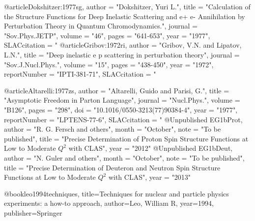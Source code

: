 @article{Dokshitzer:1977sg,
      author         = "Dokshitzer, Yuri L.",
      title          = "{Calculation of the Structure Functions for Deep
                        Inelastic Scattering and e+ e- Annihilation by
                        Perturbation Theory in Quantum Chromodynamics.}",
      journal        = "Sov.Phys.JETP",
      volume         = "46",
      pages          = "641-653",
      year           = "1977",
      SLACcitation   = "%
}
@article{Gribov:1972ri,
      author         = "Gribov, V.N. and Lipatov, L.N.",
      title          = "{Deep inelastic e p scattering in perturbation theory}",
      journal        = "Sov.J.Nucl.Phys.",
      volume         = "15",
      pages          = "438-450",
      year           = "1972",
      reportNumber   = "IPTI-381-71",
      SLACcitation   = "%
}

@article{Altarelli:1977zs,
      author         = "Altarelli, Guido and Parisi, G.",
      title          = "{Asymptotic Freedom in Parton Language}",
      journal        = "Nucl.Phys.",
      volume         = "B126",
      pages          = "298",
      doi            = "10.1016/0550-3213(77)90384-4",
      year           = "1977",
      reportNumber   = "LPTENS-77-6",
      SLACcitation   = "%
}
@Unpublished{ EG1bProt,
	author = "R. G. Fersch and others",
	month = "October",
	note = "{To be published}",
	title = "{Precise Determination of Proton Spin Structure Functions at Low to Moderate $Q^2$ with CLAS}",
	year = "2012"
}
@Unpublished{ EG1bDeut,
	author = "N. Guler and others",
	month = "October",
	note = "{To be published}",
	title = "{Precise Determination of Deuteron and Neutron Spin Structure Functions at Low to Moderate $Q^2$ with CLAS}",
	year = "2013"
}

@book{leo1994techniques,
  title={Techniques for nuclear and particle physics experiments: a how-to approach},
  author={Leo, William R},
  year={1994},
  publisher={Springer}
}

